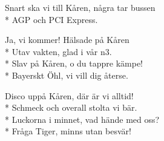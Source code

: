 \begin{SongText}
\begin{Verse}
        Snart ska vi till Kåren, några tar bussen\\*%
        AGP och PCI Express.
    \end{Verse}
    \begin{Verse}
        Ja, vi kommer! Hälsade på Kåren\\*%
        Utav vakten, glad i vår n3.\\*%
        Slav på Kåren, o du tappre kämpe!\\*%
        Bayerskt Öhl, vi vill dig återse.
    \end{Verse}
    \begin{Verse}
        Disco uppå Kåren, där är vi alltid!\\*%
        Schmeck och overall stolta vi bär.\\*%
        Luckorna i minnet, vad hände med oss?\\*%
        Fråga Tiger, minns utan besvär!
    \end{Verse}
\end{SongText}


